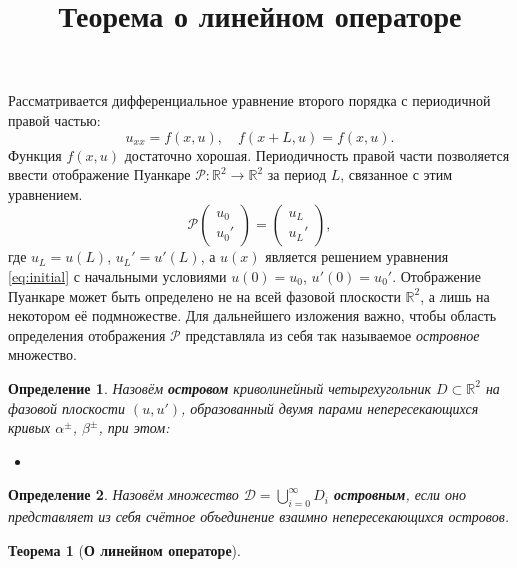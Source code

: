 \documentclass{article}
\newtheorem*{theorem}{Теорема}
\newtheorem*{definition}{Определение}
\begin{document}
\title{Теорема о линейном операторе}

\maketitle

Рассматривается дифференциальное уравнение второго порядка с периодичной правой частью:
\begin{equation}
	u_{xx} = f(x, u), \quad f(x + L, u) = f(x, u).
\label{eq:initial}
\end{equation}
Функция $f(x, u)$ достаточно хорошая.
Периодичность правой части позволяется ввести отображение Пуанкаре $\mathcal{P}: \mathbb{R}^2 \to \mathbb{R}^2$ за период $L$, связанное с этим уравнением.
\begin{equation}
	\mathcal{P} \begin{pmatrix} u_0 \\ u_0' \end{pmatrix}
	= \begin{pmatrix} u_L \\ u_L' \end{pmatrix},
\end{equation}
где $u_L = u(L)$, $u_L' = u'(L)$, а $u(x)$ является решением уравнения \eqref{eq:initial} с начальными условиями $u(0) = u_0$, $u'(0) = u_0'$.
Отображение Пуанкаре может быть определено не на всей фазовой плоскости $\mathbb{R}^2$, а лишь на некотором её подмножестве.
Для дальнейшего изложения важно, чтобы область определения отображения $\mathcal{P}$ представляла из себя так называемое {\it островное} множество.

\begin{definition}
	Назовём {\bf островом} криволинейный четырехугольник $D \subset \mathbb{R}^2$ на фазовой плоскости $(u, u')$, образованный двумя парами непересекающихся кривых $\alpha^{\pm}$, $\beta^{\pm}$, при этом:
	\begin{itemize}
		\item 
	\end{itemize}
\end{definition}

\begin{definition}
	Назовём множество $\mathcal{D} = \bigcup_{i = 0}^{\infty} D_i$ {\bf островным}, если оно представляет из себя счётное объединение взаимно непересекающихся островов.
\end{definition}

\begin{theorem}[{\bf О линейном операторе}]

\end{theorem}
\end{document}
